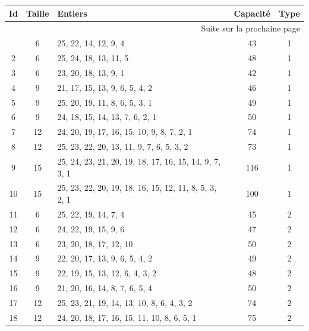 {\small
  \begin{longtable}{cclcc}
  \toprule
Id & Taille & Entiers & Capacité & Type \\
  \midrule
  \endhead

  \midrule \multicolumn{5}{r}{{Suite sur la prochaine page}} \\
  \bottomrule
  \endfoot

  \bottomrule
  \endlastfoot
    1 & 6  & 25, 22, 14, 12, 9, 4                                   & 43  & 1 \\
    2 & 6  & 25, 24, 18, 13, 11, 5                                  & 48  & 1 \\
    3 & 6  & 23, 20, 18, 13, 9, 1                                   & 42  & 1 \\
    4 & 9  & 21, 17, 15, 13, 9, 6, 5, 4, 2                          & 46  & 1 \\
    5 & 9  & 25, 20, 19, 11, 8, 6, 5, 3, 1                          & 49  & 1 \\
    6 & 9  & 24, 18, 15, 14, 13, 7, 6, 2, 1                         & 50  & 1 \\
    7 & 12 & 24, 20, 19, 17, 16, 15, 10, 9, 8, 7, 2, 1              & 74  & 1 \\
    8 & 12 & 25, 23, 22, 20, 13, 11, 9, 7, 6, 5, 3, 2               & 73  & 1 \\
    9 & 15 & 25, 24, 23, 21, 20, 19, 18, 17, 16, 15, 14, 9, 7, 3, 1 & 116 & 1 \\
   10 & 15 & 25, 23, 22, 20, 19, 18, 16, 15, 12, 11, 8, 5, 3, 2, 1  & 100 & 1 \\
   11 & 6  & 25, 22, 19, 14, 7, 4                                   & 45  & 2 \\
   12 & 6  & 24, 22, 19, 15, 9, 6                                   & 47  & 2 \\
   13 & 6  & 23, 20, 18, 17, 12, 10                                 & 50  & 2 \\
   14 & 9  & 22, 20, 17, 13, 9, 6, 5, 4, 2                          & 49  & 2 \\
   15 & 9  & 22, 19, 15, 13, 12, 6, 4, 3, 2                         & 48  & 2 \\
   16 & 9  & 21, 20, 16, 14, 8, 7, 6, 5, 4                          & 50  & 2 \\
   17 & 12 & 25, 23, 21, 19, 14, 13, 10, 8, 6, 4, 3, 2              & 74  & 2 \\
   18 & 12 & 24, 20, 18, 17, 16, 15, 11, 10, 8, 6, 5, 1             & 75  & 2 \\

\end{longtable}}
